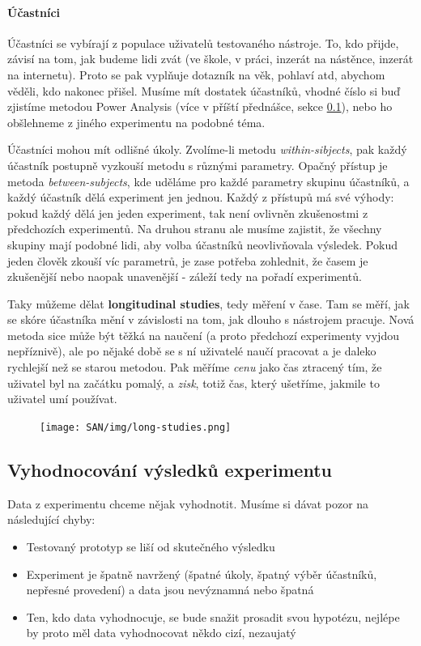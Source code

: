 \paragraph{Účastníci} Účastníci se vybírají z populace uživatelů testovaného nástroje. To, kdo přijde, závisí na tom, jak budeme lidi zvát (ve škole, v práci, inzerát na nástěnce, inzerát na internetu). Proto se pak vyplňuje dotazník na věk, pohlaví atd, abychom věděli, kdo nakonec přišel. Musíme mít dostatek účastníků, vhodné číslo si buď zjistíme metodou Power Analysis (více v příští přednášce, sekce \ref{sec:vyhodnoceni}), nebo ho obšlehneme z jiného experimentu na podobné téma.

Účastníci mohou mít odlišné úkoly. Zvolíme-li metodu \textit{within-sibjects}, pak každý účastník postupně vyzkouší metodu s různými parametry. Opačný přístup je metoda \textit{between-subjects}, kde uděláme pro každé parametry skupinu účastníků, a každý účastník dělá experiment jen jednou. Každý z přístupů má své výhody: pokud každý dělá jen jeden experiment, tak není ovlivněn zkušenostmi z předchozích experimentů. Na druhou stranu ale musíme zajistit, že všechny skupiny mají podobné lidi, aby volba účastníků neovlivňovala výsledek. Pokud jeden člověk zkouší víc parametrů, je zase potřeba zohlednit, že časem je zkušenější nebo naopak unavenější - záleží tedy na pořadí experimentů.

Taky můžeme dělat \textbf{longitudinal studies}, tedy měření v čase. Tam se měří, jak se skóre účastníka mění v závislosti na tom, jak dlouho s nástrojem pracuje. Nová metoda sice může být těžká na naučení (a proto předchozí experimenty vyjdou nepříznivě), ale po nějaké době se s ní uživatelé naučí pracovat a je daleko rychlejší než se starou metodou. Pak měříme \textit{cenu} jako čas ztracený tím, že uživatel byl na začátku pomalý, a \textit{zisk}, totiž čas, který ušetříme, jakmile to uživatel umí používat.

\begin{figure}[ht!]
\centering
\texttt{[image: SAN/img/long-studies.png]}
\end{figure}

\subsection{Vyhodnocování výsledků experimentu}
\label{sec:vyhodnoceni}

Data z experimentu chceme nějak vyhodnotit. Musíme si dávat pozor na následující chyby:
\begin{itemize}
\item Testovaný prototyp se liší od skutečného výsledku
\item Experiment je špatně navržený (špatné úkoly, špatný výběr účastníků, nepřesné provedení) a data jsou nevýznamná nebo špatná
\item Ten, kdo data vyhodnocuje, se bude snažit prosadit svou hypotézu, nejlépe by proto měl data vyhodnocovat někdo cizí, nezaujatý
\end{itemize}

